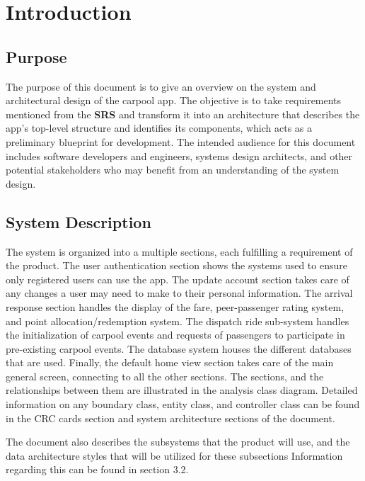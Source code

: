\documentclass[]{article}
\begin{document}
\newpage
\section{Introduction}
\label{sec:introduction}

\subsection{Purpose}
\label{sub:purpose}
The purpose of this document is to give an overview on the system and architectural design of the carpool app. The objective is to take requirements mentioned from the \textbf{SRS} and transform it into an architecture that describes the app's top-level structure and identifies its components, which acts as a preliminary blueprint for development. The intended audience for this document includes software developers and engineers, systems design architects, and other potential stakeholders who may benefit from an understanding of the system design. 

\subsection{System Description}
\label{sub:system_description}
The system is organized into a multiple sections, each fulfilling a requirement of the product. The user authentication section shows the systems used to ensure only registered users can use the app. The update account section takes care of any changes a user may need to make to their personal information. The arrival response section handles the display of the fare, peer-passenger rating system, and point allocation/redemption system. The dispatch ride sub-system handles the initialization of carpool events and requests of passengers to participate in pre-existing carpool events. The database system houses the different databases that are used. Finally, the default home view section takes care of the main general screen, connecting to all the other sections. The sections, and the relationships between them are illustrated in the analysis class diagram. Detailed information on any boundary class, entity class, and controller class can be found in the CRC cards section and system architecture sections of the document. 

The document also describes the subsystems that the product will use, and the data architecture styles that will be utilized for these subsections Information regarding this can be found in section 3.2.
\end{document}
